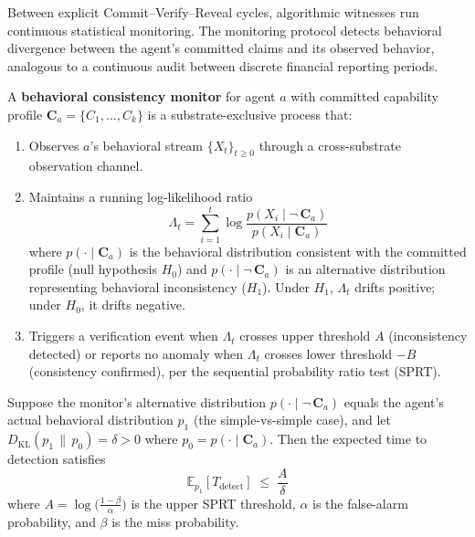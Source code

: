 Between explicit Commit--Verify--Reveal cycles, algorithmic witnesses
run continuous statistical monitoring.  The monitoring protocol detects
behavioral divergence between the agent's committed claims and its
observed behavior, analogous to a continuous audit between discrete
financial reporting periods.

\begin{definition}
\label{def:behavioral_monitor}
A \textbf{behavioral consistency monitor} for agent $a$ with committed
capability profile $\mathbf{C}_a = \{C_1, \ldots, C_k\}$ is a
substrate-exclusive process that:
\begin{enumerate}
    \item Observes $a$'s behavioral stream $\{X_t\}_{t \geq 0}$ through
    a cross-substrate observation channel.
    \item Maintains a running log-likelihood ratio
    \[
        \Lambda_t = \sum_{i=1}^{t} \log
        \frac{p(X_i \mid \neg\,\mathbf{C}_a)}{p(X_i \mid \mathbf{C}_a)}
    \]
    where $p(\cdot \mid \mathbf{C}_a)$ is the behavioral distribution
    consistent with the committed profile (null hypothesis $H_0$) and
    $p(\cdot \mid \neg\,\mathbf{C}_a)$ is an alternative distribution
    representing behavioral inconsistency ($H_1$).  Under $H_1$,
    $\Lambda_t$ drifts positive; under $H_0$, it drifts negative.
    \item Triggers a verification event when $\Lambda_t$ crosses
    upper threshold $A$ (inconsistency detected) or reports no anomaly
    when $\Lambda_t$ crosses lower threshold $-B$ (consistency
    confirmed), per the sequential probability ratio test (SPRT).
\end{enumerate}
\end{definition}

\begin{proposition}
\label{prop:sprt_detection}
Suppose the monitor's alternative distribution $p(\cdot \mid
\neg\,\mathbf{C}_a)$ equals the agent's actual behavioral distribution
$p_1$ (the simple-vs-simple case), and let
$D_{\mathrm{KL}}(p_1 \,\|\, p_0) = \delta > 0$ where
$p_0 = p(\cdot \mid \mathbf{C}_a)$.  Then the expected time to
detection satisfies
\[
    \mathbb{E}_{p_1}[T_{\mathrm{detect}}]
    \;\leq\; \frac{A}{\delta}
\]
where $A = \log\bigl(\frac{1-\beta}{\alpha}\bigr)$ is the upper SPRT
threshold, $\alpha$ is the false-alarm probability, and $\beta$ is the
miss probability.
\end{proposition}

